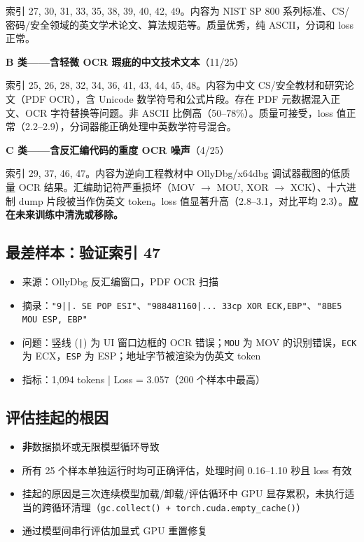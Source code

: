 \documentclass[12pt,a4paper]{ctexart}
\begin{document}
索引 27, 30, 31, 33, 35, 38, 39, 40, 42, 49。内容为 NIST SP 800 系列标准、CS/密码/安全领域的英文学术论文、算法规范等。质量优秀，纯 ASCII，分词和 loss 正常。

\textbf{B 类——含轻微 OCR 瑕疵的中文技术文本}（11/25）

索引 25, 26, 28, 32, 34, 36, 41, 43, 44, 45, 48。内容为中文 CS/安全教材和研究论文（PDF OCR），含 Unicode 数学符号和公式片段。存在 PDF 元数据混入正文、OCR 字符替换等问题。非 ASCII 比例高（50--78\%）。质量可接受，loss 值正常（2.2--2.9），分词器能正确处理中英数学符号混合。

\textbf{C 类——含反汇编代码的重度 OCR 噪声}（4/25）

索引 29, 37, 46, 47。内容为逆向工程教材中 OllyDbg/x64dbg 调试器截图的低质量 OCR 结果。汇编助记符严重损坏（MOV $\to$ MOU, XOR $\to$ XCK）、十六进制 dump 片段被当作伪英文 token。loss 值显著升高（2.8--3.1，对比平均 2.3）。\textbf{应在未来训练中清洗或移除。}

\subsection{最差样本：验证索引 47}

\begin{itemize}[nosep]
    \item 来源：OllyDbg 反汇编窗口，PDF OCR 扫描
    \item 摘录：\texttt{"9||. SE POP ESI"}、\texttt{"988481160|... 33cp XOR ECK,EBP"}、\texttt{"8BE5 MOU ESP, EBP"}
    \item 问题：竖线 (\texttt{|}) 为 UI 窗口边框的 OCR 错误；\texttt{MOU} 为 MOV 的识别错误，\texttt{ECK} 为 ECX，\texttt{ESP} 为 ESP；地址字节被渲染为伪英文 token
    \item 指标：1,094 tokens | Loss = 3.057（200 个样本中最高）
\end{itemize}

\subsection{评估挂起的根因}

\begin{itemize}[nosep]
    \item \textbf{非}数据损坏或无限模型循环导致
    \item 所有 25 个样本单独运行时均可正确评估，处理时间 0.16--1.10 秒且 loss 有效
    \item 挂起的原因是三次连续模型加载/卸载/评估循环中 GPU 显存累积，未执行适当的跨循环清理（\texttt{gc.collect() + torch.cuda.empty\_cache()}）
    \item 通过模型间串行评估加显式 GPU 重置修复
\end{itemize}
\end{document}
